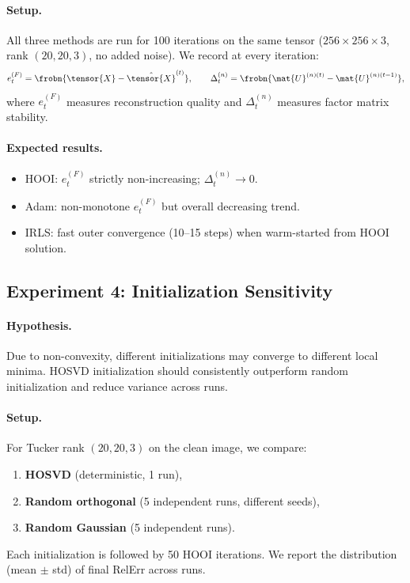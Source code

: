 \paragraph{Setup.}
All three methods are run for 100 iterations on the same tensor
($256 \times 256 \times 3$, rank $(20, 20, 3)$, no added noise).
We record at every iteration:
\begin{equation}
  e_t^{(F)} = \frobn{\tensor{X} - \hat{\tensor{X}}^{(t)}}, \qquad
  \Delta_t^{(n)} = \frobn{\mat{U}^{(n)(t)} - \mat{U}^{(n)(t-1)}},
  \label{eq:exp3_metrics}
\end{equation}
where $e_t^{(F)}$ measures reconstruction quality and
$\Delta_t^{(n)}$ measures factor matrix stability.

\paragraph{Expected results.}
\begin{itemize}
  \item HOOI: $e_t^{(F)}$ strictly non-increasing; $\Delta_t^{(n)} \to 0$.
  \item Adam: non-monotone $e_t^{(F)}$ but overall decreasing trend.
  \item IRLS: fast outer convergence (10--15 steps) when warm-started
        from HOOI solution.
\end{itemize}

\subsection{Experiment 4: Initialization Sensitivity}
\label{subsec:exp_init}

\paragraph{Hypothesis.}
Due to non-convexity, different initializations may converge to different
local minima.
HOSVD initialization should consistently outperform random initialization
and reduce variance across runs.

\paragraph{Setup.}
For Tucker rank $(20, 20, 3)$ on the clean image, we compare:
\begin{enumerate}
  \item \textbf{HOSVD} (deterministic, 1 run),
  \item \textbf{Random orthogonal} (5 independent runs, different seeds),
  \item \textbf{Random Gaussian} (5 independent runs).
\end{enumerate}
Each initialization is followed by 50 HOOI iterations.
We report the distribution (mean $\pm$ std) of final RelErr across runs.

